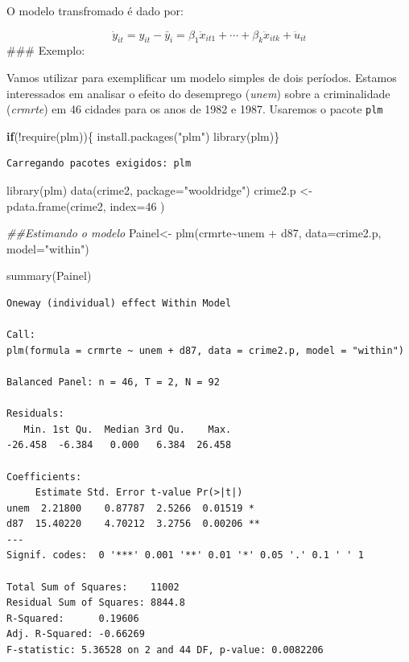 \documentclass[
  letterpaper,
  DIV=11,
  numbers=noendperiod]{scrreprt}
\newenvironment{Shaded}{\begin{snugshade}}{\end{snugshade}}
\newcommand{\AttributeTok}[1]{\textcolor[rgb]{0.40,0.45,0.13}{#1}}
\newcommand{\ControlFlowTok}[1]{\textcolor[rgb]{0.00,0.23,0.31}{\textbf{#1}}}
\newcommand{\DecValTok}[1]{\textcolor[rgb]{0.68,0.00,0.00}{#1}}
\newcommand{\DocumentationTok}[1]{\textcolor[rgb]{0.37,0.37,0.37}{\textit{#1}}}
\newcommand{\FunctionTok}[1]{\textcolor[rgb]{0.28,0.35,0.67}{#1}}
\newcommand{\NormalTok}[1]{\textcolor[rgb]{0.00,0.23,0.31}{#1}}
\newcommand{\OtherTok}[1]{\textcolor[rgb]{0.00,0.23,0.31}{#1}}
\newcommand{\SpecialCharTok}[1]{\textcolor[rgb]{0.37,0.37,0.37}{#1}}
\newcommand{\StringTok}[1]{\textcolor[rgb]{0.13,0.47,0.30}{#1}}
\begin{document}
O modelo transfromado é dado por:

\[\ddot{y}_{it} = y_{it} - \bar{y}_i = \beta_1 \ddot{x}_{it1} + \cdots + \beta_k \ddot{x}_{itk} + \ddot{u}_{it}\]
\#\#\# Exemplo:

Vamos utilizar para exemplificar um modelo simples de dois períodos.
Estamos interessados em analisar o efeito do desemprego (\emph{unem})
sobre a criminalidade (\emph{crmrte}) em 46 cidades para os anos de 1982
e 1987. Usaremos o pacote \texttt{plm}

\begin{Shaded}
\begin{Highlighting}[]
\ControlFlowTok{if}\NormalTok{(}\SpecialCharTok{!}\FunctionTok{require}\NormalTok{(plm))\{}
    \FunctionTok{install.packages}\NormalTok{(}\StringTok{"plm"}\NormalTok{)}
    \FunctionTok{library}\NormalTok{(plm)\}}
\end{Highlighting}
\end{Shaded}

\begin{verbatim}
Carregando pacotes exigidos: plm
\end{verbatim}

\begin{Shaded}
\begin{Highlighting}[]
\FunctionTok{library}\NormalTok{(plm)}
\FunctionTok{data}\NormalTok{(crime2, }\AttributeTok{package=}\StringTok{"wooldridge"}\NormalTok{)}
\NormalTok{crime2.p }\OtherTok{\textless{}{-}} \FunctionTok{pdata.frame}\NormalTok{(crime2, }\AttributeTok{index=}\DecValTok{46}\NormalTok{ )}

\DocumentationTok{\#\#Estimando o modelo}
\NormalTok{Painel}\OtherTok{\textless{}{-}} \FunctionTok{plm}\NormalTok{(crmrte}\SpecialCharTok{\textasciitilde{}}\NormalTok{unem }\SpecialCharTok{+}\NormalTok{  d87, }\AttributeTok{data=}\NormalTok{crime2.p, }\AttributeTok{model=}\StringTok{"within"}\NormalTok{)}

\FunctionTok{summary}\NormalTok{(Painel)}
\end{Highlighting}
\end{Shaded}

\begin{verbatim}
Oneway (individual) effect Within Model

Call:
plm(formula = crmrte ~ unem + d87, data = crime2.p, model = "within")

Balanced Panel: n = 46, T = 2, N = 92

Residuals:
   Min. 1st Qu.  Median 3rd Qu.    Max. 
-26.458  -6.384   0.000   6.384  26.458 

Coefficients:
     Estimate Std. Error t-value Pr(>|t|)   
unem  2.21800    0.87787  2.5266  0.01519 * 
d87  15.40220    4.70212  3.2756  0.00206 **
---
Signif. codes:  0 '***' 0.001 '**' 0.01 '*' 0.05 '.' 0.1 ' ' 1

Total Sum of Squares:    11002
Residual Sum of Squares: 8844.8
R-Squared:      0.19606
Adj. R-Squared: -0.66269
F-statistic: 5.36528 on 2 and 44 DF, p-value: 0.0082206
\end{verbatim}
\end{document}
